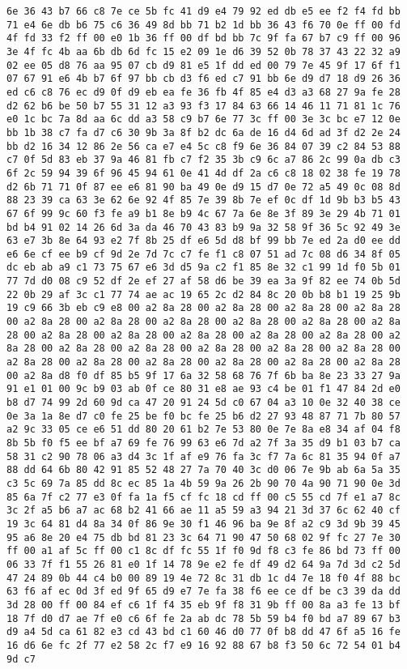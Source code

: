 \documentclass{article}
\begin{document}
\begin{verbatim}
6e 36 43 b7 66 c8 7e ce 5b fc 41 d9 e4 79 92 ed db e5 ee f2 f4 fd bb 71 e4 6e db b6 75 c6 36 49 8d bb 71 b2 1d bb 36 43 f6 70 0e ff 00 fd 4f fd 33 f2 ff 00 e0 1b 36 ff 00 df bd bb 7c 9f fa 67 b7 c9 ff 00 96 3e 4f fc 4b aa 6b db 6d fc 15 e2 09 1e d6 39 52 0b 78 37 43 22 32 a9 02 ee 05 d8 76 aa 95 07 cb d9 81 e5 1f dd ed 00 79 7e 45 9f 17 6f f1 07 67 91 e6 4b b7 6f 97 bb cb d3 f6 ed c7 91 bb 6e d9 d7 18 d9 26 36 ed c6 c8 76 ec d9 0f d9 eb ea fe 36 fb 4f 85 e4 d3 a3 68 27 9a fe 28 d2 62 b6 be 50 b7 55 31 12 a3 93 f3 17 84 63 66 14 46 11 71 81 1c 76 e0 1c bc 7a 8d aa 6c dd a3 58 c9 b7 6e 77 3c ff 00 3e 3c bc e7 12 0e bb 1b 38 c7 fa d7 c6 30 9b 3a 8f b2 dc 6a de 16 d4 6d ad 3f d2 2e 24 bb d2 16 34 12 86 2e 56 ca e7 e4 5c c8 f9 6e 36 84 07 39 c2 84 53 88 c7 0f 5d 83 eb 37 9a 46 81 fb c7 f2 35 3b c9 6c a7 86 2c 99 0a db c3 6f 2c 59 94 39 6f 96 45 94 61 0e 41 4d df 2a c6 c8 18 02 38 fe 19 78 d2 6b 71 71 0f 87 ee e6 81 90 ba 49 0e d9 15 d7 0e 72 a5 49 0c 08 8d 88 23 39 ca 63 3e 62 6e 92 4f 85 7e 39 8b 7e ef 0c df 1d 9b b3 b5 43 67 6f 99 9c 60 f3 fe a9 b1 8e b9 4c 67 7a 6e 8e 3f 89 3e 29 4b 71 01 bd b4 91 02 14 26 6d 3a da 46 70 43 83 b9 9a 32 58 9f 36 5c 92 49 3e 63 e7 3b 8e 64 93 e2 7f 8b 25 df e6 5d d8 bf 99 bb 7e ed 2a d0 ee dd e6 6e cf ee b9 cf 9d 2e 7d 7c c7 fe f1 c8 07 51 ad 7c 08 d6 34 8f 05 dc eb ab a9 c1 73 75 67 e6 3d d5 9a c2 f1 85 8e 32 c1 99 1d f0 5b 01 77 7d d0 08 c9 52 df 2e ef 27 af 58 d6 be 39 ea 3a 9f 82 ee 74 0b 5d 22 0b 29 af 3c c1 77 74 ae ac 19 65 2c d2 84 8c 20 0b b8 b1 19 25 9b 19 c9 66 3b eb c9 e8 00 a2 8a 28 00 a2 8a 28 00 a2 8a 28 00 a2 8a 28 00 a2 8a 28 00 a2 8a 28 00 a2 8a 28 00 a2 8a 28 00 a2 8a 28 00 a2 8a 28 00 a2 8a 28 00 a2 8a 28 00 a2 8a 28 00 a2 8a 28 00 a2 8a 28 00 a2 8a 28 00 a2 8a 28 00 a2 8a 28 00 a2 8a 28 00 a2 8a 28 00 a2 8a 28 00 a2 8a 28 00 a2 8a 28 00 a2 8a 28 00 a2 8a 28 00 a2 8a 28 00 a2 8a 28 00 a2 8a d8 f0 df 85 b5 9f 17 6a 32 58 68 76 7f 6b ba 8e 23 33 27 9a 91 e1 01 00 9c b9 03 ab 0f ce 80 31 e8 ae 93 c4 be 01 f1 47 84 2d e0 b8 d7 74 99 2d 60 9d ca 47 20 91 24 5d c0 67 04 a3 10 0e 32 40 38 ce 0e 3a 1a 8e d7 c0 fe 25 be f0 bc fe 25 b6 d2 27 93 48 87 71 7b 80 57 a2 9c 33 05 ce e6 51 dd 80 20 61 b2 7e 53 80 0e 7e 8a e8 34 af 04 f8 8b 5b f0 f5 ee bf a7 69 fe 76 99 63 e6 7d a2 7f 3a 35 d9 b1 03 b7 ca 58 31 c2 90 78 06 a3 d4 3c 1f af e9 76 fa 3c f7 7a 6c 81 35 94 0f a7 88 dd 64 6b 80 42 91 85 52 48 27 7a 70 40 3c d0 06 7e 9b ab 6a 5a 35 c3 5c 69 7a 85 dd 8c ec 85 1a 4b 59 9a 26 2b 90 70 4a 90 71 90 0e 3d 85 6a 7f c2 77 e3 0f fa 1a f5 cf fc 18 cd ff 00 c5 55 cd 7f e1 a7 8c 3c 2f a5 b6 a7 ac 68 b2 41 66 ae 11 a5 59 a3 94 21 3d 37 6c 62 40 cf 19 3c 64 81 d4 8a 34 0f 86 9e 30 f1 46 96 ba 9e 8f a2 c9 3d 9b 39 45 95 a6 8e 20 e4 75 db bd 81 23 3c 64 71 90 47 50 68 02 9f fc 27 7e 30 ff 00 a1 af 5c ff 00 c1 8c df fc 55 1f f0 9d f8 c3 fe 86 bd 73 ff 00 06 33 7f f1 55 26 81 e0 1f 14 78 9e e2 fe df 49 d2 64 9a 7d 3d c2 5d 47 24 89 0b 44 c4 b0 00 89 19 4e 72 8c 31 db 1c d4 7e 18 f0 4f 88 bc 63 f6 af ec 0d 3f ed 9f 65 d9 e7 7e fa 38 f6 ee ce df be c3 39 da dd 3d 28 00 ff 00 84 ef c6 1f f4 35 eb 9f f8 31 9b ff 00 8a a3 fe 13 bf 18 7f d0 d7 ae 7f e0 c6 6f fe 2a ab dc 78 5b 59 b4 f0 bd a7 89 67 b3 d9 a4 5d ca 61 82 e3 cd 43 bd c1 60 46 d0 77 0f b8 dd 47 6f a5 16 fe 16 d6 6e fc 2f 77 e2 58 2c f7 e9 16 92 88 67 b8 f3 50 6c 72 54 01 b4 9d c7 
\end{verbatim}
\end{document}
